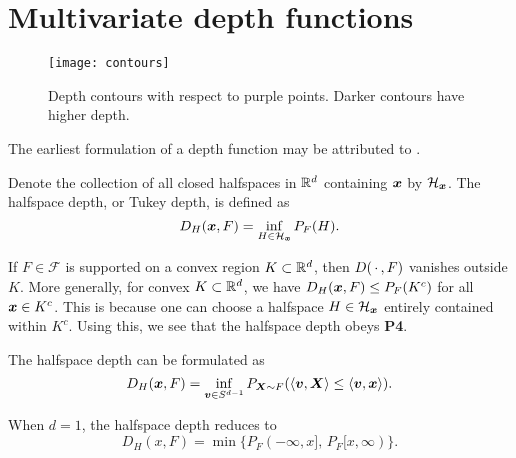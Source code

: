 \section{Multivariate depth functions}

\begin{figure}
    \centering
    \texttt{[image: contours]}
    \caption{
        Depth contours with respect to purple points.
        Darker contours have higher depth.
    }
    \label{fig:depthcontours}
\end{figure}


The earliest formulation of a depth function may be attributed to
\textcite{tukey-1975}.

\begin{definition}
    Denote the collection of all closed halfspaces in $\mathbb{R}^d$ containing $\bm{x}$
    by $\mathcal{H}_{\bm{x}}$.
    The halfspace depth, or Tukey depth, is defined as
    \begin{equation}
        D_H(\bm{x}, F) = \inf_{H \in \mathcal{H}_{\bm{x}}} P_{F}(H). \label{eq:halfspace}
    \end{equation}
\end{definition}

\begin{remark}
    If $F \in \mathscr{F}$ is supported on a convex region $K \subset \mathbb{R}^d$,
    then $D(\,\cdot\,, F)$ vanishes outside $K$.
    More generally, for convex $K \subset \mathbb{R}^d$, we have $D_H(\bm{x}, F) \leq
    P_F(K^c)$ for all $\bm{x} \in K^c$.
    This is because one can choose a halfspace $H \in \mathcal{H}_{\bm{x}}$
    entirely contained within $K^c$.
    Using this, we see that the halfspace depth obeys \textbf{P4}.
\end{remark}

\begin{proposition}
    The halfspace depth can be formulated as
    \begin{equation}
        D_H(\bm{x}, F) = \inf_{\bm{v} \in S^{d - 1}} P_{\bm{X} \sim F}(\langle \bm{v}, \bm{X} \rangle \leq \langle \bm{v}, \bm{x} \rangle).
    \end{equation}
\end{proposition}

\begin{remark}
    When $d = 1$, the halfspace depth reduces to
    \begin{equation}
        D_H(x, F) = \min\{P_F(-\infty, x],\, P_F[x, \infty)\}.
    \end{equation}
\end{remark}



